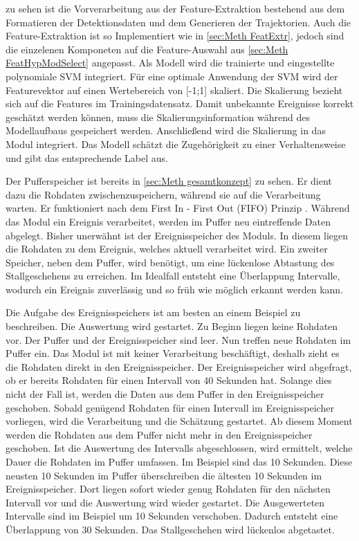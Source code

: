 zu sehen ist die Vorverarbeitung aus der Feature-Extraktion bestehend aus dem Formatieren  der Detektionsdaten und dem Generieren der Trajektorien. Auch die Feature-Extraktion ist so Implementiert wie in \autoref{sec:Meth FeatExtr}, jedoch sind die einzelenen Komponeten auf die Feature-Auswahl aus \autoref{sec:Meth FeatHypModSelect} angepasst. Als Modell wird die trainierte und eingestellte polynomiale SVM integriert. Für eine optimale Anwendung der SVM wird der Featurevektor auf einen Wertebereich von [-1;1] skaliert. Die Skalierung bezieht sich auf die Features im Trainingsdatensatz. Damit unbekannte Ereignisse korrekt geschätzt werden können, muss die Skalierungsinformation während des Modellaufbaus gespeichert werden. Anschließend wird die Skalierung in das Modul integriert. Das Modell schätzt die Zugehörigkeit zu einer Verhaltensweise und gibt das entsprechende Label aus.\par

Der Pufferspeicher ist bereits in \autoref{sec:Meth gesamtkonzept} zu sehen. Er dient dazu die Rohdaten zwischenzuspeichern, während sie auf die Verarbeitung warten. Er funktioniert nach dem First In - First Out (\acrshort{FIFO}) Prinzip \cite{Sedgewick.2011}. Während das Modul ein Ereignis verarbeitet, werden im Puffer neu eintreffende Daten abgelegt. Bisher unerwähnt ist der Ereignisspeicher des Moduls. In diesem liegen die Rohdaten zu dem Ereignis, welches aktuell verarbeitet wird. Ein zweiter Speicher, neben dem Puffer, wird benötigt, um eine lückenlose Abtastung des Stallgeschehens zu erreichen. Im Idealfall entsteht eine Überlappung Intervalle, wodurch ein Ereignis zuverlässig und so früh wie möglich erkannt werden kann. \par

Die Aufgabe des Ereignisspeichers ist am besten an einem Beispiel zu beschreiben. Die Auswertung wird gestartet. Zu Beginn liegen keine Rohdaten vor. Der Puffer und der Ereignisspeicher sind leer. Nun treffen neue Rohdaten im Puffer ein. Das Modul ist mit keiner Verarbeitung beschäftigt, deshalb zieht es die Rohdaten direkt in den Ereignisspeicher. Der Ereignisspeicher wird abgefragt, ob er bereits Rohdaten für einen Intervall von 40 Sekunden hat. Solange dies nicht der Fall ist, werden die Daten aus dem Puffer in den Ereignisspeicher geschoben. Sobald genügend Rohdaten für einen Intervall im Ereignisspeicher vorliegen, wird die Verarbeitung und die Schätzung gestartet. Ab diesem Moment werden die Rohdaten aus dem Puffer nicht mehr in den Ereignisspeicher geschoben. Ist die Auswertung des Intervalls abgeschlossen, wird ermittelt, welche Dauer die Rohdaten im Puffer umfassen. Im Beispiel sind das 10 Sekunden. Diese neusten 10 Sekunden im Puffer überschreiben die ältesten 10 Sekunden im Ereignisspeicher. Dort liegen sofort wieder genug Rohdaten für den nächsten Intervall vor und die Auswertung wird wieder gestartet. Die Ausgewerteten Intervalle sind im Beispiel um 10 Sekunden verschoben. Dadurch entsteht eine Überlappung von 30 Sekunden. Das Stallgeschehen wird lückenlos abgetastet. \par

